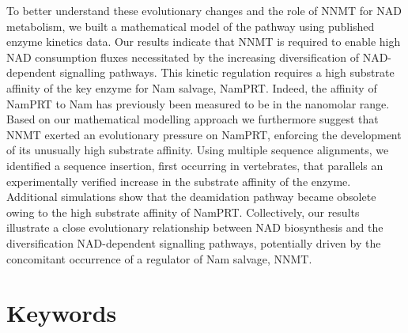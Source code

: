To better understand these evolutionary changes and the role of NNMT for NAD metabolism, we built a mathematical model of the pathway using published enzyme kinetics data. Our results indicate that NNMT is required to enable high NAD consumption fluxes necessitated by the increasing diversification of NAD-dependent signalling pathways. This kinetic regulation requires a high substrate affinity of the key enzyme for Nam salvage, NamPRT. Indeed, the affinity of NamPRT to Nam has previously been measured to be in the nanomolar range. Based on our mathematical modelling approach we furthermore suggest that NNMT exerted an evolutionary pressure on NamPRT, enforcing the development of its unusually high substrate affinity. Using multiple sequence alignments, we identified a sequence insertion, first occurring in vertebrates, that parallels an experimentally verified increase in the substrate affinity of the enzyme. Additional simulations show that the deamidation pathway became obsolete owing to the high substrate affinity of NamPRT. Collectively, our results illustrate a close evolutionary relationship between NAD biosynthesis and the diversification NAD-dependent signalling pathways, potentially driven by the concomitant occurrence of a regulator of Nam salvage, NNMT.


\section*{Keywords}
